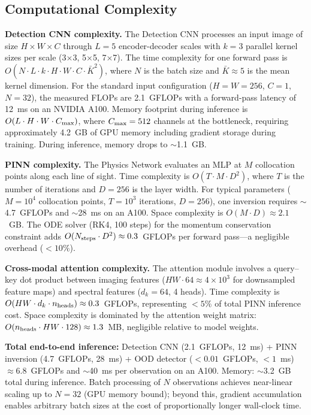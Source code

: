 \documentclass[usenatbib]{mnras}
\begin{document}
\subsection{Computational Complexity}\label{sec:complexity}

\textbf{Detection CNN complexity.} The Detection CNN processes an input image of size $H \times W \times C$ through $L = 5$ encoder-decoder scales with $k = 3$ parallel kernel sizes per scale (3$\times$3, 5$\times$5, 7$\times$7). The time complexity for one forward pass is $O(N \cdot L \cdot k \cdot H \cdot W \cdot C \cdot \bar{K}^2)$, where $N$ is the batch size and $\bar{K} \approx 5$ is the mean kernel dimension. For the standard input configuration ($H=W=256$, $C=1$, $N=32$), the measured FLOPs are 2.1~GFLOPs with a forward-pass latency of 12~ms on an NVIDIA A100. Memory footprint during inference is $O(L \cdot H \cdot W \cdot C_{\rm max})$, where $C_{\rm max}=512$ channels at the bottleneck, requiring approximately 4.2~GB of GPU memory including gradient storage during training. During inference, memory drops to $\sim$1.1~GB.

\textbf{PINN complexity.} The Physics Network evaluates an MLP at $M$ collocation points along each line of sight. Time complexity is $O(T \cdot M \cdot D^2)$, where $T$ is the number of iterations and $D=256$ is the layer width. For typical parameters ($M=10^4$ collocation points, $T=10^3$ iterations, $D=256$), one inversion requires $\sim$4.7~GFLOPs and $\sim$28~ms on an A100. Space complexity is $O(M \cdot D) \approx 2.1$~GB. The ODE solver (RK4, 100 steps) for the momentum conservation constraint adds $O(N_{\rm steps} \cdot D^2) \approx 0.3$~GFLOPs per forward pass---a negligible overhead ($<10\%$).

\textbf{Cross-modal attention complexity.} The attention module involves a query--key dot product between imaging features ($HW \cdot 64 \approx 4 \times 10^3$ for downsampled feature maps) and spectral features ($d_k=64$, 4 heads). Time complexity is $O(HW \cdot d_k \cdot n_{\rm heads}) \approx 0.3$~GFLOPs, representing $<5\%$ of total PINN inference cost. Space complexity is dominated by the attention weight matrix: $O(n_{\rm heads} \cdot HW \cdot 128) \approx 1.3$~MB, negligible relative to model weights.

\textbf{Total end-to-end inference:} Detection CNN (2.1~GFLOPs, 12~ms) + PINN inversion (4.7~GFLOPs, 28~ms) + OOD detector ($<0.01$~GFLOPs, $<1$~ms) $\approx 6.8$~GFLOPs and $\sim$40~ms per observation on an A100. Memory: $\sim$3.2~GB total during inference. Batch processing of $N$ observations achieves near-linear scaling up to $N=32$ (GPU memory bound); beyond this, gradient accumulation enables arbitrary batch sizes at the cost of proportionally longer wall-clock time.
\end{document}
